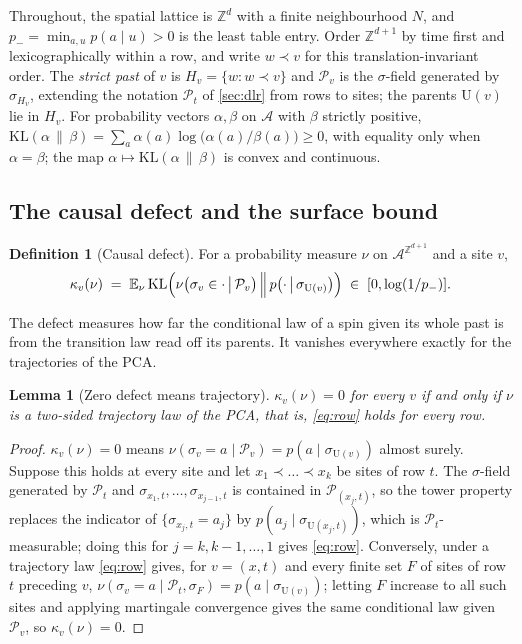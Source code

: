\documentclass[11pt]{article}
\theoremstyle{plain}
\newtheorem{lemma}[theorem]{Lemma}
\theoremstyle{definition}
\newtheorem{definition}[theorem]{Definition}
\theoremstyle{remark}
\newcommand{\A}{\mathcal{A}}
\newcommand{\Z}{\mathbb{Z}}
\newcommand{\E}{\mathbb{E}}
\newcommand{\Ue}{\mathrm{U}}
\begin{document}
Throughout, the spatial lattice is $\Z^d$ with a finite neighbourhood $N$, and $p_-=\min_{a,u}p(a\mid u)>0$ is the least table entry. Order $\Z^{d+1}$ by time first and lexicographically within a row, and write $w\prec v$ for this translation-invariant order. The \emph{strict past} of $v$ is $H_v=\{w:w\prec v\}$ and $\mathcal P_v$ is the $\sigma$-field generated by $\sigma_{H_v}$, extending the notation $\mathcal P_t$ of \cref{sec:dlr} from rows to sites; the parents $\Ue(v)$ lie in $H_v$. For probability vectors $\alpha,\beta$ on $\A$ with $\beta$ strictly positive, $\mathrm{KL}(\alpha\,\|\,\beta)=\sum_a\alpha(a)\log\bigl(\alpha(a)/\beta(a)\bigr)\ge0$, with equality only when $\alpha=\beta$; the map $\alpha\mapsto\mathrm{KL}(\alpha\,\|\,\beta)$ is convex and continuous.

\subsection{The causal defect and the surface bound}

\begin{definition}[Causal defect]
\label{def:defect}
For a probability measure $\nu$ on $\A^{\Z^{d+1}}$ and a site $v$,
\begin{equation}
\kappa_v(\nu)\;=\;\E_\nu\,\mathrm{KL}\Bigl(\nu\bigl(\sigma_v\in\cdot\,\big|\,\mathcal P_v\bigr)\,\Big\|\,p\bigl(\cdot\,\big|\,\sigma_{\Ue(v)}\bigr)\Bigr)\;\in\;[0,\log(1/p_-)].
\label{eq:defect}
\end{equation}
\end{definition}

The defect measures how far the conditional law of a spin given its whole past is from the transition law read off its parents. It vanishes everywhere exactly for the trajectories of the PCA.

\begin{lemma}[Zero defect means trajectory]
\label{lem:zerodefect}
$\kappa_v(\nu)=0$ for every $v$ if and only if $\nu$ is a two-sided trajectory law of the PCA, that is, \eqref{eq:row} holds for every row.
\end{lemma}

\begin{proof}
$\kappa_v(\nu)=0$ means $\nu(\sigma_v=a\mid\mathcal P_v)=p(a\mid\sigma_{\Ue(v)})$ almost surely. Suppose this holds at every site and let $x_1\prec\dots\prec x_k$ be sites of row $t$. The $\sigma$-field generated by $\mathcal P_t$ and $\sigma_{x_1,t},\dots,\sigma_{x_{j-1},t}$ is contained in $\mathcal P_{(x_j,t)}$, so the tower property replaces the indicator of $\{\sigma_{x_j,t}=a_j\}$ by $p(a_j\mid\sigma_{\Ue(x_j,t)})$, which is $\mathcal P_t$-measurable; doing this for $j=k,k-1,\dots,1$ gives \eqref{eq:row}. Conversely, under a trajectory law \eqref{eq:row} gives, for $v=(x,t)$ and every finite set $F$ of sites of row $t$ preceding $v$, $\nu(\sigma_v=a\mid\mathcal P_t,\sigma_{F})=p(a\mid\sigma_{\Ue(v)})$; letting $F$ increase to all such sites and applying martingale convergence gives the same conditional law given $\mathcal P_v$, so $\kappa_v(\nu)=0$.
\end{proof}
\end{document}

